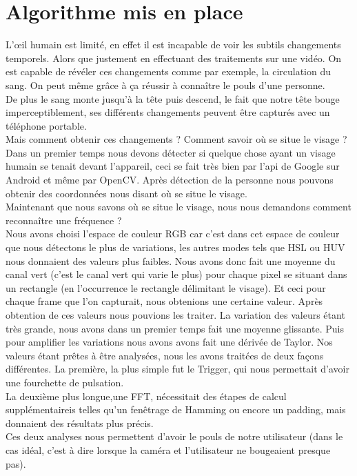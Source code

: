 \section{Algorithme mis en place}

L’\oe il humain est limité, en effet il est incapable de voir les subtils changements temporels. Alors
que justement en effectuant des traitements sur une vidéo. On est capable de révéler ces changements
comme par exemple, la circulation du sang. On peut même grâce à ça réussir à connaître le pouls d'une
personne.
\\
De plus le sang monte jusqu'à la tête puis descend, le fait que notre tête bouge imperceptiblement, ses différents changements peuvent être capturés avec un téléphone portable.
\\
Mais comment obtenir ces changements ? Comment savoir où se situe le visage ?\\

 Dans un premier temps nous devons détecter si quelque chose ayant un visage humain se tenait devant l'appareil, ceci se fait très bien par l'api de Google sur Android et même par OpenCV.
 Après détection de la personne nous pouvons obtenir des coordonnées nous disant où se situe le visage.\\
 Maintenant que nous savons où se situe le visage, nous nous demandons comment reconnaître une fréquence ?\\
 Nous avons choisi l'espace de couleur RGB car c'est dans cet espace de couleur que nous détectons le plus de variations, les autres modes tels que HSL ou HUV nous donnaient des valeurs plus faibles.
 Nous avons donc fait une moyenne du canal vert (c'est le canal vert qui varie le plus) pour chaque pixel se situant dans un rectangle (en l’occurrence le rectangle délimitant le visage).
 Et ceci pour chaque frame que l'on capturait, nous obtenions une certaine valeur.
 Après obtention de ces valeurs nous pouvions les traiter.
 La variation des valeurs étant très grande, nous avons dans un premier temps fait une moyenne glissante. Puis pour amplifier les variations nous avons avons fait une dérivée de Taylor.
 Nos valeurs étant prêtes à être analysées, nous les avons traitées de deux façons différentes.
 La première, la plus simple fut le Trigger, qui nous permettait d'avoir une fourchette de pulsation.\\ La deuxième plus longue,une FFT, nécessitait des étapes de calcul supplémentaireis telles qu'un fenêtrage de Hamming ou encore un padding, mais donnaient des résultats plus précis.
 \\
 Ces deux analyses nous permettent d'avoir le pouls de notre utilisateur (dans le cas idéal, c'est à dire lorsque la caméra et l'utilisateur ne bougeaient presque pas).
 \\

